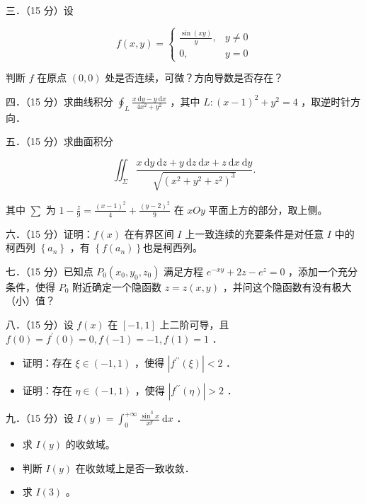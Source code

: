 \documentclass{article}
\begin{document}
三．（15 分）设

\[
f(x, y)= \begin{cases}\frac{\sin (x y)}{y}, & y \neq 0 \\ 0, & y=0\end{cases}
\]

判断 \(f\) 在原点 \((0,0)\) 处是否连续，可微？方向导数是否存在？

四．（15 分）求曲线积分 \(\oint_{L} \frac{x \mathrm{~d} y-y \mathrm{~d} x}{4 x^{2}+y^{2}}\) ，其中 \(L:(x-1)^{2}+y^{2}=4\) ，取逆时针方向．

五．（15 分）求曲面积分

\[
\iint_{\Sigma} \frac{x \mathrm{~d} y \mathrm{~d} z+y \mathrm{~d} z \mathrm{~d} x+z \mathrm{~d} x \mathrm{~d} y}{\sqrt{\left(x^{2}+y^{2}+z^{2}\right)^{3}}} .
\]

其中 \(\sum\) 为 \(1-\frac{z}{9}=\frac{(x-1)^{2}}{4}+\frac{(y-2)^{2}}{9}\) 在 \(x O y\) 平面上方的部分，取上侧。

六．（15 分）证明：\(f(x)\) 在有界区间 \(I\) 上一致连续的充要条件是对任意 \(I\) 中的柯西列 \(\left\{a_{n}\right\}\) ，有 \(\left\{f\left(a_{n}\right)\right\}\)也是柯西列。

七．（15 分）已知点 \(P_{0}\left(x_{0}, y_{0}, z_{0}\right)\) 满足方程 \(e^{-x y}+2 z-e^{z}=0\) ，添加一个充分条件，使得 \(P_{0}\) 附近确定一个隐函数 \(z=z(x, y)\) ，并问这个隐函数有没有极大（小）值？

八．（15 分）设 \(f(x)\) 在 \([-1,1]\) 上二阶可导，且 \(f(0)=f^{\prime}(0)=0, f(-1)=-1, f(1)=1\) ．

\begin{itemize}
  \item[（1）] 证明：存在 \(\xi \in(-1,1)\) ，使得 \(\left|f^{\prime \prime}(\xi)\right|<2\) ．
  \item[（2）] 证明：存在 \(\eta \in(-1,1)\) ，使得 \(\left|f^{\prime \prime}(\eta)\right|>2\) ．
\end{itemize}

九．（15 分）设 \(I(y)=\int_{0}^{+\infty} \frac{\sin ^{3} x}{x^{y}} \mathrm{~d} x\) ．

\begin{itemize}
  \item[（1）] 求 \(I(y)\) 的收敛域。
  \item[（2）] 判断 \(I(y)\) 在收敛域上是否一致收敛．
  \item[（3）] 求 \(I(3)\) 。
\end{itemize}
\end{document}
